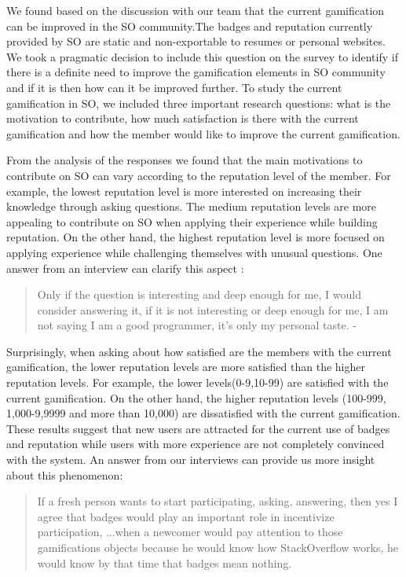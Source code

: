 \documentclass{sigchi}
\begin{document}
We found based on the discussion with our team that the current gamification can be improved in the SO community.The badges and reputation currently provided by SO are static and non-exportable to resumes or personal websites. We took a pragmatic decision to include this question on the survey to identify if there is a definite need to improve the gamification elements in SO community and if it is then how can it be improved further. To study the current gamification in SO, we included three important research questions: what is the motivation to contribute, how much satisfaction is there with the current gamification and how the member would like to improve the current gamification.

From the analysis of the responses we found that the main motivations to contribute on SO can vary according to the reputation level of the member. For example, the lowest reputation level is more interested on increasing their knowledge through asking questions. The medium reputation levels are more appealing to contribute on SO when applying their experience while building reputation. On the other hand, the highest reputation level is more focused on applying experience while challenging themselves with unusual questions. One answer from an interview can clarify this aspect :

\begin{quote}
Only if the question is interesting and deep enough for me, I would consider answering it, if it is not interesting or deep enough for me, I am not saying I am a good programmer, it’s only my personal taste. - 
\end{quote}

Surprisingly, when asking about how satisfied are the members with the current gamification, the lower reputation levels are more satisfied than the higher reputation levels. For example, the lower levels(0-9,10-99) are satisfied with the current gamification. On the other hand, the higher  reputation levels (100-999, 1,000-9,9999 and more than 10,000) are dissatisfied with the current gamification. These results suggest that new users are attracted for the current use of badges and reputation while users with more experience are not completely convinced with the system. An answer from our interviews can provide us more insight about this phenomenon:

\begin{quote}
If a fresh person wants to start participating, asking, answering, then yes I agree that badges would play an important role in incentivize participation, ...when a newcomer would pay attention to those gamifications objects because he would know how StackOverflow works, he would know by that time that badges mean nothing.
\end{quote}
\end{document}
